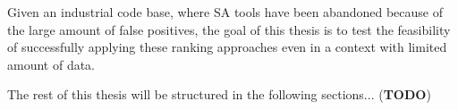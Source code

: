 

Given an industrial code base, where SA tools have been abandoned because of the large amount of false positives, the goal of this thesis is to test the feasibility of successfully applying these ranking approaches even in a context with limited amount of data.



The rest of this thesis will be structured in the following sections... (\textbf{TODO})






